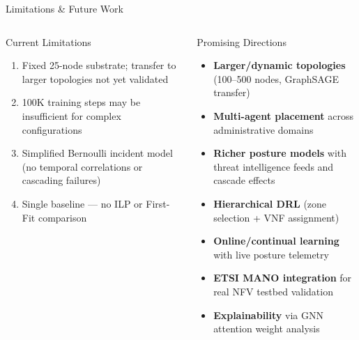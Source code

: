 \begin{frame}{Limitations \& Future Work}
  \begin{columns}[T]
      \begin{alertblock}{Current Limitations}
        \footnotesize
        \begin{enumerate}
          \item Fixed 25-node substrate; transfer to larger topologies not yet validated
          \item 100K training steps may be insufficient for complex configurations
          \item Simplified Bernoulli incident model (no temporal correlations or cascading failures)
          \item Single baseline --- no ILP or First-Fit comparison
        \end{enumerate}
      \end{alertblock}
      \begin{block}{Promising Directions}
        \footnotesize
        \begin{itemize}
          \item \textbf{Larger/dynamic topologies} (100--500 nodes, GraphSAGE transfer)
          \item \textbf{Multi-agent placement} across administrative domains
          \item \textbf{Richer posture models} with threat intelligence feeds and cascade effects
          \item \textbf{Hierarchical DRL} (zone selection + VNF assignment)
          \item \textbf{Online/continual learning} with live posture telemetry
          \item \textbf{ETSI MANO integration} for real NFV testbed validation
          \item \textbf{Explainability} via GNN attention weight analysis
        \end{itemize}
      \end{block}
  \end{columns}
\end{frame}

